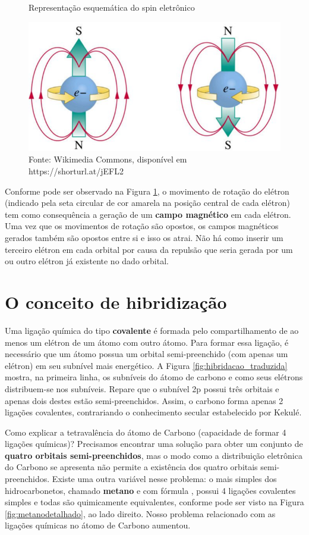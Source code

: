 \begin{figure}[h]
\centering
\caption{Representação esquemática do spin eletrônico}
\vspace{0.25cm}
\label{fig:spin}
\includegraphics[width=0.5\linewidth]{imagens/spin.png}
\caption*{Fonte: Wikimedia Commons, disponível em https://shorturl.at/jEFL2}
\end{figure}

Conforme pode ser observado na Figura \ref{fig:spin}, o movimento de rotação do elétron (indicado pela seta circular de cor amarela na posição central de cada elétron) tem como consequência a geração de um \textbf{campo magnético} em cada elétron. Uma vez que os movimentos de rotação são opostos, os campos magnéticos gerados também são opostos entre si e isso os atrai. Não há como inserir um terceiro elétron em cada orbital por causa da repulsão que seria gerada por um ou outro elétron já existente no dado orbital.

\section{O conceito de hibridização}
Uma ligação química do tipo \textbf{covalente} é formada pelo compartilhamento de ao menos um elétron de um átomo com outro átomo. Para formar essa ligação, é necessário que um átomo possua um orbital semi-preenchido (com apenas um elétron) em seu subnível mais energético. A Figura \ref{fig:hibridacao_traduzida} mostra, na primeira linha, os subníveis do átomo de carbono e como seus elétrons distribuem-se nos subníveis. Repare que o subnível 2p possui três orbitais e apenas dois destes estão semi-preenchidos. Assim, o carbono forma apenas 2 ligações covalentes, contrariando o conhecimento secular estabelecido por Kekulé.

Como explicar a tetravalência do átomo de Carbono (capacidade de formar 4 ligações químicas)? Precisamos encontrar uma solução para obter um conjunto de \textbf{quatro orbitais semi-preenchidos}, mas o modo como a distribuição eletrônica do Carbono se apresenta não permite a existência dos quatro orbitais semi-preenchidos. Existe uma outra variável nesse problema: o mais simples dos hidrocarbonetos, chamado \textbf{metano} e com fórmula \textbf{}, possui 4 ligações covalentes simples e todas são quimicamente equivalentes, conforme pode ser visto na Figura \ref{fig:metanodetalhado}, ao lado direito. Nosso problema relacionado com as ligações químicas no átomo de Carbono aumentou.

